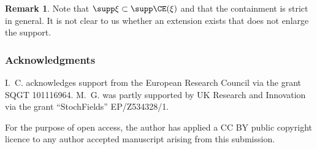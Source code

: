\documentclass[11pt,a4paper]{article}
\numberwithin{equation}{section}
\theoremstyle{definition}
\newtheorem{remark}[theorem]{Remark}
\theoremstyle{remark}
\begin{document}
\begin{remark}
Note that $\supp \xi\subset\supp\CE(\xi)$ and that the containment is strict in general.
It is not clear to us whether an extension exists that does not enlarge the support. 
\end{remark}

\subsubsection*{Acknowledgments}

I.~C. acknowledges support from the European Research Council via the grant SQGT 101116964.
M.~G. was partly supported by UK Research and Innovation via the grant ``StochFields'' EP/Z534328/1.

For the purpose of open access, the author has applied a CC BY public copyright licence to any author accepted manuscript arising from this submission.


{}
\end{document}

